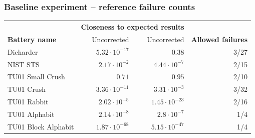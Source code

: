 \documentclass[aspectratio=169]{beamer}
\newcommand{\gr}{\cellcolor{green!40}}
\newcommand{\backupend}{
   \setcounter{framenumber}{\value{finalframe}}
}
\begin{document}
\begin{frame}
\frametitle{Baseline experiment -- reference failure counts}
\begin{table}
\begin{nomar}
\centering
\begin{tabular}{@{}lrrr@{}}
                                                                                                                  \toprule
                      & \multicolumn{2}{c}{\textbf{Closeness to expected results}} &                           \\ \cmidrule(lr){2-3}
\textbf{Battery name} & Uncorrected               & Uncorrected                    & \textbf{Allowed failures} \\ \midrule
Dieharder             &    $5.32 \cdot 10^{-17}$  & \gr$0.38$                      & 3/27                      \\ 
NIST STS              & \gr$2.17 \cdot 10^{-2}$   &    $4.44 \cdot 10^{-7}$        & 2/15                      \\ 
TU01 Small Crush      &    $0.71$                 & \gr$0.95$                      & 2/10                      \\ 
TU01 Crush            &    $3.36 \cdot 10^{-11}$  & \gr$3.31 \cdot 10^{-3}$        & 3/32                      \\ 
TU01 Rabbit           & \gr$2.02 \cdot 10^{-5}$   &    $1.45 \cdot 10^{-23}$       & 2/16                      \\ 
TU01 Alphabit         &    $2.14 \cdot 10^{-8}$   & \gr$2.8 \cdot 10^{-7}$         & 1/4                       \\ 
TU01 Block Alphabit   &    $1.87 \cdot 10^{-68}$  & \gr$5.15 \cdot 10^{-47}$       & 1/4                       \\ \bottomrule
\end{tabular}
\end{nomar}
\end{table}
\end{frame}

\backupend
\end{document}
